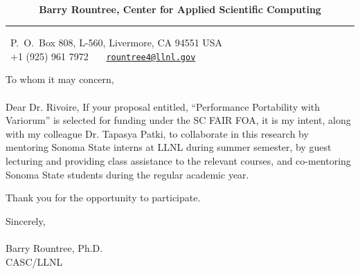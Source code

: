 \documentclass[12pt]{article}
\begin{document}
~\vspace{-0.02in}
\begin{flushleft}
{\large\bf \ \ \ \ \ \ Barry Rountree, Center for Applied Scientific Computing}
\end{flushleft}
\medskip\hrule height 1pt
\begin{flushright}
\hfill \Letter\ P.~O.~Box 808, L-560, Livermore, CA 94551 USA\\
\hfill \Telefon\ +1 (925) 961 7972 \ \ \Email\ \href{mailto:rountree@llnl.gov}{\nolinkurl{rountree4@llnl.gov}}
\end{flushright}

\vspace{0.6in}
\noindent
\noindent


To whom it may concern,\\~\\

Dear Dr. Rivoire,
If your proposal entitled, ``Performance Portability with Variorum''  is
selected for funding under the SC FAIR FOA, it is my intent, along with my 
colleague Dr. Tapasya Patki, to collaborate in
this research by mentoring Sonoma State interns at LLNL during summer semester,
by guest lecturing and providing class assistance to the relevant courses,
and co-mentoring Sonoma State students during the regular academic year.

Thank you for the opportunity to participate. 

\vspace{0.4in}
\noindent
Sincerely,\\
\vspace{0.25in}\\
Barry Rountree, Ph.D.\\
CASC/LLNL\\
\end{document}
